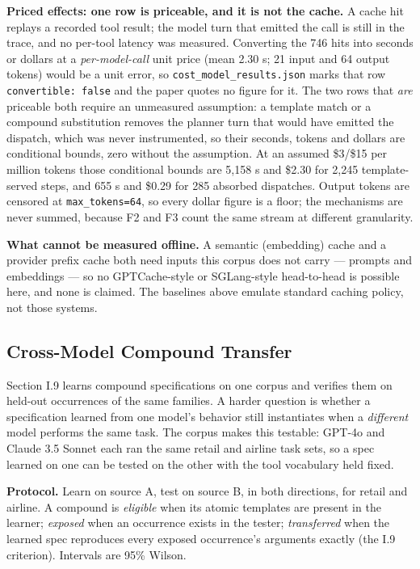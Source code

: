 \documentclass[
  11pt,
]{article}
\newcounter{none} %
\begin{document}
\textbf{Priced effects: one row is priceable, and it is not the cache.}
A cache hit replays a recorded tool result; the model turn that emitted
the call is still in the trace, and no per-tool latency was measured.
Converting the 746 hits into seconds or dollars at a
\emph{per-model-call} unit price (mean 2.30 s; 21 input and 64 output
tokens) would be a unit error, so \texttt{cost\_model\_results.json}
marks that row \texttt{convertible:\ false} and the paper quotes no
figure for it. The two rows that \emph{are} priceable both require an
unmeasured assumption: a template match or a compound substitution
removes the planner turn that would have emitted the dispatch, which was
never instrumented, so their seconds, tokens and dollars are conditional
bounds, zero without the assumption. At an assumed \$3/\$15 per million
tokens those conditional bounds are 5,158 s and \$2.30 for 2,245
template-served steps, and 655 s and \$0.29 for 285 absorbed dispatches.
Output tokens are censored at \texttt{max\_tokens=64}, so every dollar
figure is a floor; the mechanisms are never summed, because F2 and F3
count the same stream at different granularity.

\textbf{What cannot be measured offline.} A semantic (embedding) cache
and a provider prefix cache both need inputs this corpus does not carry
--- prompts and embeddings --- so no GPTCache-style or SGLang-style
head-to-head is possible here, and none is claimed. The baselines above
emulate standard caching policy, not those systems.

\subsection{Cross-Model Compound
Transfer}\label{cross-model-compound-transfer}

Section I.9 learns compound specifications on one corpus and verifies
them on held-out occurrences of the same families. A harder question is
whether a specification learned from one model's behavior still
instantiates when a \emph{different} model performs the same task. The
corpus makes this testable: GPT-4o and Claude 3.5 Sonnet each ran the
same retail and airline task sets, so a spec learned on one can be
tested on the other with the tool vocabulary held fixed.

\textbf{Protocol.} Learn on source A, test on source B, in both
directions, for retail and airline. A compound is \emph{eligible} when
its atomic templates are present in the learner; \emph{exposed} when an
occurrence exists in the tester; \emph{transferred} when the learned
spec reproduces every exposed occurrence's arguments exactly (the I.9
criterion). Intervals are 95\% Wilson.
\end{document}
